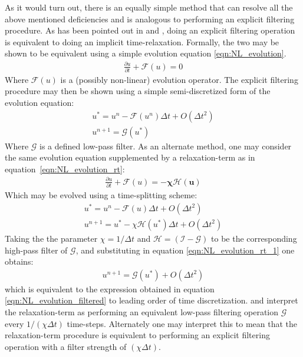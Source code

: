 As it would turn out, there is an equally simple method that can resolve all the above mentioned deficiencies and is analogous to performing an explicit filtering procedure. As has been pointed out in \cite{stolz01} and \cite{schlatter04}, doing an explicit filtering operation is equivalent to doing an implicit time-relaxation. Formally, the two may be shown to be equivalent using a simple evolution equation \ref{eqn:NL_evolution}.
\begin{align}
\frac{\partial u}{\partial t} + \mathcal{F}(u) = 0
\label{eqn:NL_evolution}
\end{align}
Where $\mathcal{F}(u)$ is a (possibly non-linear) evolution operator.
The explicit filtering procedure may then be shown using a simple semi-discretized form of the evolution equation:
\begin{align}
u^{*} = u^{n} - \mathcal{F}(u^{n})\Delta t + O(\Delta t^{2})\nonumber \\
u^{n+1} =  \mathcal{G}(u^{*}) %
\label{eqn:NL_evolution_filtered}
\end{align}
Where $\mathcal{G}$ is a defined low-pass filter. As an alternate method, one may consider the same evolution equation supplemented by a relaxation-term as in equation~\ref{eqn:NL_evolution_rt}:
\begin{align}
\frac{\partial u}{\partial t} + \mathcal{F}(u) = \boldsymbol{-\chi \mathcal{H}(u)}
\label{eqn:NL_evolution_rt}
\end{align}
Which may be evolved using a time-splitting scheme:
\begin{align}
u^{*} = u^{n} -\mathcal{F}(u)\Delta t + O(\Delta t^{2})	\nonumber \\
u^{n+1} = u^{*} -\chi \mathcal{H}(u^{*})\Delta t + O(\Delta t^{2})
\label{eqn:NL_evolution_rt_1}
\end{align}
Taking the the parameter $\chi=1/\Delta t$ and $\mathcal{H}=\mathcal{(I-G)}$ to be the corresponding high-pass filter of $\mathcal{G}$, and substituting in equation \ref{eqn:NL_evolution_rt_1} one obtains:
\begin{align}
u^{n+1} = \mathcal{G}(u^{*}) + O(\Delta t^{2})
\label{eqn:NL_evolution_rt_2}
\end{align}
which is equivalent to the expression obtained in equation \ref{eqn:NL_evolution_filtered} to leading order of time discretization. \cite{stolz01} and \cite{schlatter04} interpret the relaxation-term as performing an equivalent low-pass filtering operation $\mathcal{G}$ every $1/(\chi\Delta t)$ time-steps. Alternately one may interpret this to mean that the relaxation-term procedure is equivalent to performing an explicit filtering operation with a filter strength of $(\chi\Delta t)$. 

